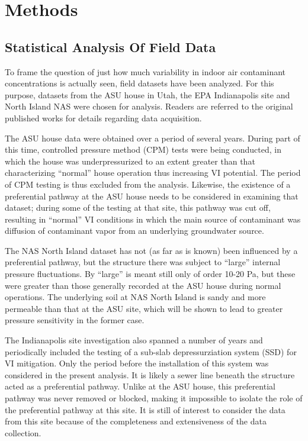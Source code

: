 \documentclass[journal=esthag,manuscript=article]{achemso}
\begin{document}
\section{Methods}


\subsection{Statistical Analysis Of Field Data}

To frame the question of just how much variability in indoor air contaminant concentrations is actually seen, field datasets have been analyzed.
For this purpose, datasets from the ASU house in Utah, the EPA Indianapolis site and North Island NAS were chosen for analysis.
Readers are referred to the original published works for details regarding data acquisition\cite{holton_evaluation_2015,guo_vapor_2015,holton_temporal_2013,hosangadi_high-frequency_2017,u.s._environmental_protection_agency_assessment_2015}.

The ASU house data were obtained over a period of several years.
During part of this time, controlled pressure method (CPM) tests were being conducted, in which the house was underpressurized to an extent greater than that characterizing “normal” house operation thus increasing VI potential\cite{mchugh_evaluation_2012,mchugh_recent_2017,holton_evaluation_2015}.
The period of CPM testing is thus excluded from the analysis.
Likewise, the existence of a preferential pathway at the ASU house needs to be considered in examining that dataset; during some of the testing at that site, this pathway was cut off, resulting in “normal” VI conditions in which the main source of contaminant was diffusion of contaminant vapor from an underlying groundwater source.

The NAS North Island dataset has not (as far as is known) been influenced by a preferential pathway, but the structure there was subject to “large” internal pressure fluctuations.
By “large” is meant still only of order 10-20 Pa, but these were greater than those generally recorded at the ASU house during normal operations.
The underlying soil at NAS North Island is sandy\cite{hosangadi_high-frequency_2017} and more permeable than that at the ASU site, which will be shown to lead to greater pressure sensitivity in the former case.

The Indianapolis site investigation also spanned a number of years and periodically included the testing of a sub-slab depressurziation system (SSD) for VI mitigation.
Only the period before the installation of this system was considered in the present analysis.
It is likely a sewer line beneath the structure acted as a preferential pathway\cite{mchugh_evidence_2017}.
Unlike at the ASU house, this preferential pathway was never removed or blocked, making it impossible to isolate the role of the preferential pathway at this site.
It is still of interest to consider the data from this site because of the completeness and extensiveness of the data collection.
\end{document}
